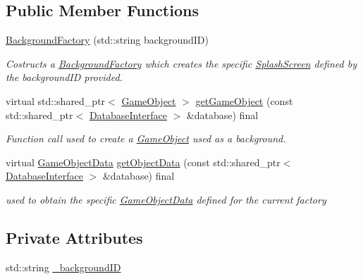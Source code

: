 \subsection*{Public Member Functions}
\begin{DoxyCompactItemize}
\item 
\hyperlink{class_background_factory_a002c292a123aaf3f47f7c70a0abf9406}{Background\+Factory} (std\+::string background\+ID)
\begin{DoxyCompactList}\small\item\em Costructs a \hyperlink{class_background_factory}{Background\+Factory} which creates the specific \hyperlink{class_splash_screen}{Splash\+Screen} defined by the background\+ID provided. \end{DoxyCompactList}\item 
virtual std\+::shared\+\_\+ptr$<$ \hyperlink{class_game_object}{Game\+Object} $>$ \hyperlink{class_background_factory_a17793b3ec704137388b70f53361691c3}{get\+Game\+Object} (const std\+::shared\+\_\+ptr$<$ \hyperlink{class_database_interface}{Database\+Interface} $>$ \&database) final
\begin{DoxyCompactList}\small\item\em Function call used to create a \hyperlink{class_game_object}{Game\+Object} used as a background. \end{DoxyCompactList}\item 
virtual \hyperlink{struct_game_object_data}{Game\+Object\+Data} \hyperlink{class_background_factory_aed13815bcb56568c4b465b5a531ee053}{get\+Object\+Data} (const std\+::shared\+\_\+ptr$<$ \hyperlink{class_database_interface}{Database\+Interface} $>$ \&database) final
\begin{DoxyCompactList}\small\item\em used to obtain the specific \hyperlink{struct_game_object_data}{Game\+Object\+Data} defined for the current factory \end{DoxyCompactList}\end{DoxyCompactItemize}
\subsection*{Private Attributes}
\begin{DoxyCompactItemize}
\item 
std\+::string \hyperlink{class_background_factory_a88dfa3ed001d4975bc8a76f5603d5017}{\+\_\+background\+ID}
\end{DoxyCompactItemize}


